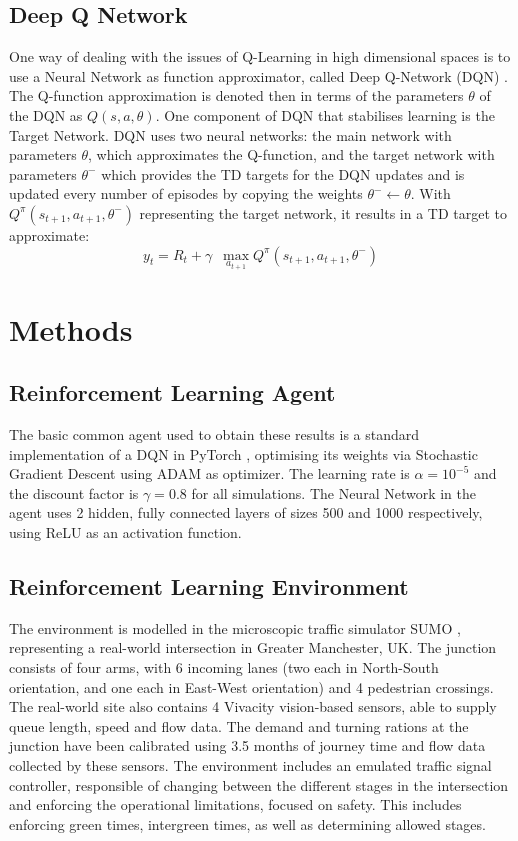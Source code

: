 \documentclass[conference]{IEEEtran}
\begin{document}
\subsection{Deep Q Network}
One way of dealing with the issues of Q-Learning in high dimensional spaces is to use a Neural Network as function approximator, called Deep Q-Network (DQN) \cite{mnih2015}.
The Q-function approximation is denoted then in terms of the parameters $\theta$ of the DQN as $Q(s,a,\theta)$.
One component of DQN that stabilises learning is the Target Network. DQN uses two neural networks: the main network with parameters $\theta$, which approximates the Q-function, and the target network with parameters $\theta^-$ which provides the TD targets for the DQN updates and is updated every number of episodes by copying the weights $\theta^- \leftarrow \theta$. With $Q^{\pi} (s_{t+1}, a_{t+1}, \theta^-)$ representing the target network, it results in a TD target to approximate:
\begin{equation}
y_t = R_t + \gamma \,\,\, \max_{a_{t+1}} Q^{\pi} (s_{t+1}, a_{t+1}, \theta^-)
\end{equation}
\section{Methods}
\subsection{Reinforcement Learning Agent}
The basic common agent used to obtain these results is a standard implementation of a DQN in PyTorch \cite{pytorch}, optimising its weights via Stochastic Gradient Descent \cite{kiefer} using ADAM \cite{adam} as optimizer.
The learning rate is $\alpha=10^{-5}$ and the discount factor is $\gamma = 0.8$ for all simulations.
The Neural Network in the agent uses 2 hidden, fully connected layers of sizes 500 and 1000 respectively, using ReLU as an activation function.
\subsection{Reinforcement Learning Environment}
The environment is modelled in the microscopic traffic simulator SUMO \cite{sumo}, representing a real-world intersection in Greater Manchester, UK.
The junction consists of four arms, with 6 incoming lanes (two each in North-South orientation, and one each in East-West orientation) and 4 pedestrian crossings.
The real-world site also contains 4 Vivacity vision-based sensors, able to supply queue length, speed and flow data.
The demand and turning rations at the junction have been calibrated using 3.5 months of journey time and flow data collected by these sensors.
The environment includes an emulated traffic signal controller, responsible of changing between the different stages in the intersection and enforcing the operational limitations, focused on safety.
This includes enforcing green times, intergreen times, as well as determining allowed stages.  
\end{document}
